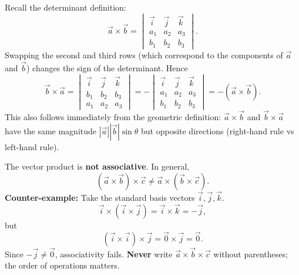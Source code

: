 \documentclass[11pt]{article}
\begin{document}
\begin{exemplebox}
Recall the determinant definition:
\[
\vec{a} \times \vec{b} = \begin{vmatrix}
\vec{i} & \vec{j} & \vec{k} \\
a_1 & a_2 & a_3 \\
b_1 & b_2 & b_3
\end{vmatrix}.
\]
Swapping the second and third rows (which correspond to the components of $\vec{a}$ and $\vec{b}$) changes the sign of the determinant. Hence
\[
\vec{b} \times \vec{a} = \begin{vmatrix}
\vec{i} & \vec{j} & \vec{k} \\
b_1 & b_2 & b_3 \\
a_1 & a_2 & a_3
\end{vmatrix} = -\begin{vmatrix}
\vec{i} & \vec{j} & \vec{k} \\
a_1 & a_2 & a_3 \\
b_1 & b_2 & b_3
\end{vmatrix} = -(\vec{a} \times \vec{b}).
\]
This also follows immediately from the geometric definition: $\vec{a} \times \vec{b}$ and $\vec{b} \times \vec{a}$ have the same magnitude $|\vec{a}||\vec{b}|\sin\theta$ but opposite directions (right-hand rule vs left-hand rule).
\end{exemplebox}

\begin{attention}
The vector product is \textbf{not associative}. In general,
\[
(\vec{a} \times \vec{b}) \times \vec{c} \neq \vec{a} \times (\vec{b} \times \vec{c}).
\]
\textbf{Counter-example:} Take the standard basis vectors $\vec{i}, \vec{j}, \vec{k}$.
\[
\vec{i} \times (\vec{i} \times \vec{j}) = \vec{i} \times \vec{k} = -\vec{j},
\]
but
\[
(\vec{i} \times \vec{i}) \times \vec{j} = \vec{0} \times \vec{j} = \vec{0}.
\]
Since $-\vec{j} \neq \vec{0}$, associativity fails. \textbf{Never} write $\vec{a} \times \vec{b} \times \vec{c}$ without parentheses; the order of operations matters.
\end{attention}
\end{document}
